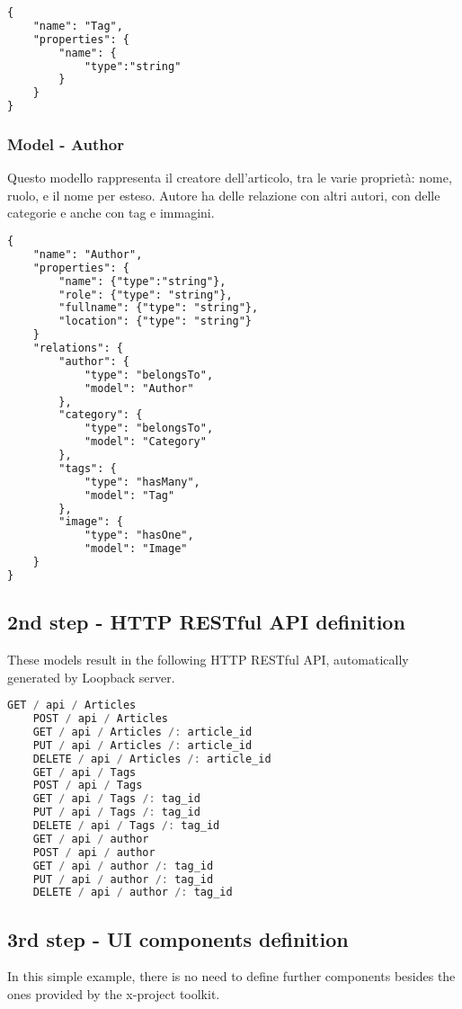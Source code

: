\begin{lstlisting}[language=html]
{
	"name": "Tag",
	"properties": {
		"name": {
			"type":"string"
		}
	}
}
\end{lstlisting}
\subsubsection{Model - Author}

Questo modello rappresenta il creatore dell'articolo, tra le varie proprietà: nome, ruolo, e il nome per esteso.
Autore ha delle relazione con altri autori, con delle categorie e anche con tag e immagini.

\begin{lstlisting}[language=html]
{
	"name": "Author",
	"properties": {
		"name": {"type":"string"},
    	"role": {"type": "string"},
    	"fullname": {"type": "string"},
    	"location": {"type": "string"}
	}
	"relations": {
    	"author": {
     		"type": "belongsTo",
      		"model": "Author"
    	},
    	"category": {
      		"type": "belongsTo",
      		"model": "Category"
    	},
    	"tags": {
      		"type": "hasMany",
      		"model": "Tag"
    	},
    	"image": {
      		"type": "hasOne",
      		"model": "Image"
    }
}
\end{lstlisting}

\subsection{2nd step - HTTP RESTful API definition}

These models result in the following HTTP RESTful API, automatically generated by Loopback server.

\begin{lstlisting}[language=javascript]
	GET / api / Articles
	POST / api / Articles
	GET / api / Articles /: article_id
	PUT / api / Articles /: article_id
	DELETE / api / Articles /: article_id
	GET / api / Tags
	POST / api / Tags
	GET / api / Tags /: tag_id
	PUT / api / Tags /: tag_id
	DELETE / api / Tags /: tag_id
	GET / api / author
	POST / api / author
	GET / api / author /: tag_id
	PUT / api / author /: tag_id
	DELETE / api / author /: tag_id
\end{lstlisting}

\subsection{3rd step - UI components definition}

In this simple example, there is no need to define further components besides the ones provided by the x-project toolkit.

